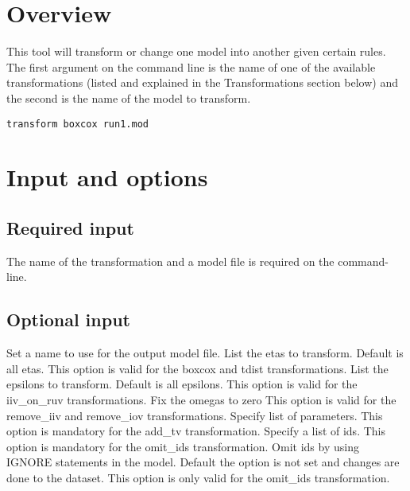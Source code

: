 



\maketitle
\newcommand{\guidetoolname}{transform}


\section{Overview}
This tool will transform or change one model into another given certain rules. The first argument on the command line is the name of one of the available transformations (listed and explained in the Transformations section below) and the second is the name of the model to transform.

\begin{verbatim}
transform boxcox run1.mod
\end{verbatim}

\section{Input and options}

\subsection{Required input}
The name of the transformation and a model file is required on the command-line.


\subsection{Optional input}

\begin{optionlist}
Set a name to use for the output model file. 
\nextopt
{}
List the etas to transform. Default is all etas.
This option is valid for the boxcox and tdist transformations.
\nextopt
      List the epsilons to transform. Default is all epsilons.
      This option is valid for the iiv\_on\_ruv transformations.
    \nextopt
      Fix the omegas to zero
      This option is valid for the remove\_iiv and remove\_iov transformations.
    \nextopt
      Specify list of parameters.
      This option is mandatory for the add\_tv transformation.
    \nextopt
      Specify a list of ids.
      This option is mandatory for the omit\_ids transformation.
    \nextopt
      Omit ids by using IGNORE statements in the model.
      Default the option is not set and changes are done to the dataset.
      This option is only valid for the omit\_ids transformation.
    \nextopt
\end{optionlist}

